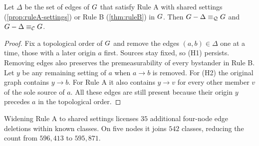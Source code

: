 \begin{lemma}\label{lem:simultaneous}
Let $\Delta$ be the set of edges of $G$ that satisfy Rule A with shared settings (\cref{prop:ruleA-settings})
or Rule B (\cref{thm:ruleB}) in $G$. Then
$G-\Delta\equiv_{\mathcal{Q}}G$ and $G-\Delta\equiv_{\mathcal{C}}G$.
\end{lemma}
\begin{proof}
Fix a topological order of $G$ and remove the edges $(a,b)\in\Delta$ one at a time, those with a later origin $a$
first. Sources stay fixed, so (H1) persists. Removing edges also preserves the premeasurability of every
bystander in Rule B. Let $y$ be any remaining setting of $a$ when $a\to b$ is removed. For (H2) the original
graph contains $y\to b$. For Rule A it also contains $y\to v$ for every other member $v$ of the sole source of
$a$. All these edges are still present because their origin $y$ precedes $a$ in the topological order.
\end{proof}

Widening Rule A to shared settings licenses $35$ additional four-node edge deletions within known
classes. On five nodes it joins $542$ classes, reducing the count from $596{,}413$ to $595{,}871$.

